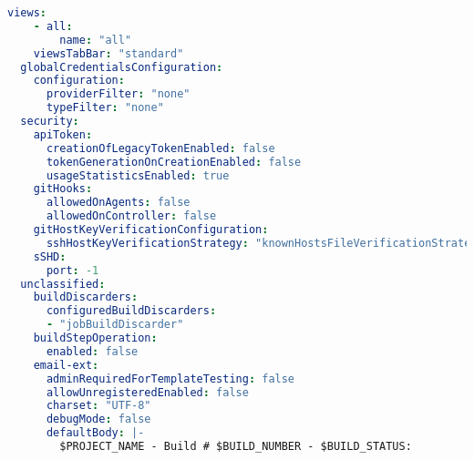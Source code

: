 \begin{lstlisting}[language=yaml, style=yamlstyle]
    views:
    - all:
        name: "all"
    viewsTabBar: "standard"
  globalCredentialsConfiguration:
    configuration:
      providerFilter: "none"
      typeFilter: "none"
  security:
    apiToken:
      creationOfLegacyTokenEnabled: false
      tokenGenerationOnCreationEnabled: false
      usageStatisticsEnabled: true
    gitHooks:
      allowedOnAgents: false
      allowedOnController: false
    gitHostKeyVerificationConfiguration:
      sshHostKeyVerificationStrategy: "knownHostsFileVerificationStrategy"
    sSHD:
      port: -1
  unclassified:
    buildDiscarders:
      configuredBuildDiscarders:
      - "jobBuildDiscarder"
    buildStepOperation:
      enabled: false
    email-ext:
      adminRequiredForTemplateTesting: false
      allowUnregisteredEnabled: false
      charset: "UTF-8"
      debugMode: false
      defaultBody: |-
        $PROJECT_NAME - Build # $BUILD_NUMBER - $BUILD_STATUS:
  

\end{lstlisting}
